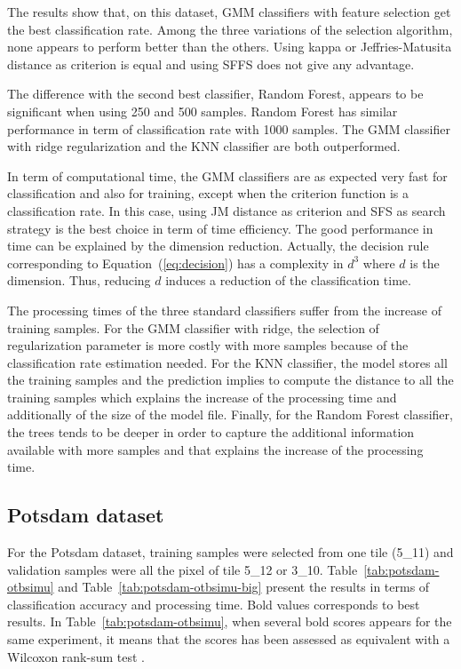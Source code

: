 \documentclass[journal]{IEEEtran}
\begin{document}
    The results show that, on this  dataset, GMM classifiers with feature selection get the best classification rate. Among the three variations of the selection algorithm, none appears to perform better than the others. Using kappa or Jeffries-Matusita distance as criterion is equal and using SFFS does not give any advantage.

    The difference with the second best classifier, Random Forest, appears to be significant when using 250 and 500 samples. Random Forest has similar performance in term of classification rate with 1000 samples. The GMM classifier with ridge regularization and the KNN classifier are both outperformed.

    In term of computational time, the GMM classifiers are as expected very fast for classification and also for training, except when the criterion function is a classification rate. In this case, using JM distance as criterion and SFS as search strategy is the best choice in term of time efficiency. The good performance in time can be explained by the dimension reduction. Actually, the decision rule corresponding to Equation~(\ref{eq:decision}) has a complexity in $d^3$ where $d$ is the dimension. Thus, reducing $d$ induces a reduction of the classification time.

    The processing times of the three standard classifiers suffer from the increase of training samples. For the GMM classifier with ridge, the selection of regularization parameter is more costly with more samples because of the classification rate estimation needed. For the KNN classifier, the model stores all the training samples and the prediction implies to compute the distance to all the training samples which explains the increase of the processing time and additionally of the size of the model file. Finally, for the Random Forest classifier, the trees tends to be deeper in order to capture the additional information available with more samples and that explains the increase of the processing time.

    \subsection{Potsdam dataset}

    For the Potsdam  dataset, training samples were  selected from one
    tile (5\_11)  and validation  samples were all  the pixel  of tile
    5\_12     or    3\_10.      Table~\ref{tab:potsdam-otbsimu}    and
    Table~\ref{tab:potsdam-otbsimu-big} present  the results  in terms
    of classification accuracy and processing time. Bold values corresponds to best results. In Table~\ref{tab:potsdam-otbsimu}, when several bold scores appears for the same experiment, it means that the scores has been assessed as equivalent with a Wilcoxon rank-sum test \cite{mann1947test}.
\end{document}
